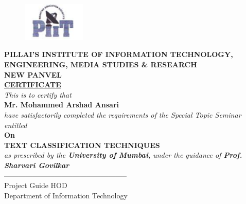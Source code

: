 \documentclass[12pt]{book}
\begin{document}
\begin{figure}[ht!]
    \centering
    \includegraphics[width=30mm]{piit.png}
\end{figure}
\begin{center}
    \fontsize{14}{20}\selectfont \textbf{PILLAI'S INSTITUTE OF INFORMATION TECHNOLOGY,\\ENGINEERING, MEDIA STUDIES \& RESEARCH\\ NEW PANVEL}\\
    \fontsize{22}{50}\selectfont \textbf{\underline{CERTIFICATE}}\\
    \fontsize{14}{40}\selectfont \textit{This is to certify that}\\
    \fontsize{14}{40}\selectfont \textbf{Mr. Mohammed Arshad Ansari}\\
    \fontsize{14}{40}\selectfont \textit{have satisfactorily completed the requirements of the Special Topic Seminar entitled}\\
    \fontsize{14}{40}\selectfont \textbf{On}\\
    \fontsize{20}{40}\selectfont \textbf{TEXT CLASSIFICATION TECHNIQUES}\\
    \fontsize{14}{40}\selectfont \textit{as prescribed by the \textbf{University of Mumbai}, under the guidance of \textbf{Prof. Sharvari Govilkar}}\\
    \vspace{30mm}
    \noindent --------------------------\hfill--------------------------\\
    \noindent Project Guide \hfill HOD\\
    \noindent\hfill \fontsize{14}{20}\selectfont Department of Information Technology


\end{center}
	
\end{document}
